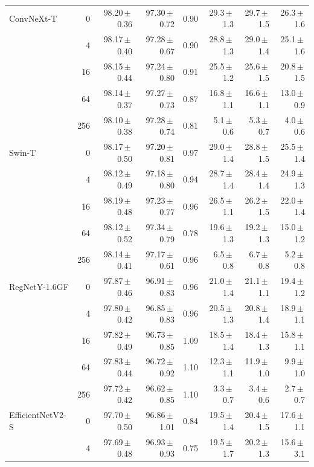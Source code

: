 {\begin{longtable}{lrrrrrrr}
ConvNeXt-T & 0 & 98.20\,$\pm$\,0.36 & 97.30\,$\pm$\,0.72 & 0.90 & 29.3\,$\pm$\,1.3 & 29.7\,$\pm$\,1.5 & 26.3\,$\pm$\,1.6 \\
 & 4 & 98.17\,$\pm$\,0.40 & 97.28\,$\pm$\,0.67 & 0.90 & 28.8\,$\pm$\,1.3 & 29.0\,$\pm$\,1.4 & 25.1\,$\pm$\,1.6 \\
 & 16 & 98.15\,$\pm$\,0.44 & 97.24\,$\pm$\,0.80 & 0.91 & 25.5\,$\pm$\,1.2 & 25.6\,$\pm$\,1.5 & 20.8\,$\pm$\,1.5 \\
 & 64 & 98.14\,$\pm$\,0.37 & 97.27\,$\pm$\,0.73 & 0.87 & 16.8\,$\pm$\,1.1 & 16.6\,$\pm$\,1.1 & 13.0\,$\pm$\,0.9 \\
 & 256 & 98.10\,$\pm$\,0.38 & 97.28\,$\pm$\,0.74 & 0.81 & 5.1\,$\pm$\,0.6 & 5.3\,$\pm$\,0.7 & 4.0\,$\pm$\,0.6 \\
Swin-T & 0 & 98.17\,$\pm$\,0.50 & 97.20\,$\pm$\,0.81 & 0.97 & 29.0\,$\pm$\,1.4 & 28.8\,$\pm$\,1.5 & 25.5\,$\pm$\,1.4 \\
 & 4 & 98.12\,$\pm$\,0.49 & 97.18\,$\pm$\,0.80 & 0.94 & 28.7\,$\pm$\,1.4 & 28.4\,$\pm$\,1.4 & 24.9\,$\pm$\,1.3 \\
 & 16 & 98.19\,$\pm$\,0.48 & 97.23\,$\pm$\,0.77 & 0.96 & 26.5\,$\pm$\,1.1 & 26.2\,$\pm$\,1.5 & 22.0\,$\pm$\,1.4 \\
 & 64 & 98.12\,$\pm$\,0.52 & 97.34\,$\pm$\,0.79 & 0.78 & 19.6\,$\pm$\,1.3 & 19.2\,$\pm$\,1.3 & 15.0\,$\pm$\,1.2 \\
 & 256 & 98.14\,$\pm$\,0.41 & 97.17\,$\pm$\,0.61 & 0.96 & 6.5\,$\pm$\,0.8 & 6.7\,$\pm$\,0.8 & 5.2\,$\pm$\,0.8 \\
RegNetY-1.6GF & 0 & 97.87\,$\pm$\,0.46 & 96.91\,$\pm$\,0.83 & 0.96 & 21.0\,$\pm$\,1.4 & 21.1\,$\pm$\,1.1 & 19.4\,$\pm$\,1.2 \\
 & 4 & 97.80\,$\pm$\,0.42 & 96.85\,$\pm$\,0.83 & 0.96 & 20.5\,$\pm$\,1.3 & 20.8\,$\pm$\,1.4 & 18.9\,$\pm$\,1.1 \\
 & 16 & 97.82\,$\pm$\,0.49 & 96.73\,$\pm$\,0.85 & 1.09 & 18.5\,$\pm$\,1.4 & 18.4\,$\pm$\,1.3 & 15.8\,$\pm$\,1.1 \\
 & 64 & 97.83\,$\pm$\,0.44 & 96.72\,$\pm$\,0.92 & 1.10 & 12.3\,$\pm$\,1.1 & 11.9\,$\pm$\,1.0 & 9.9\,$\pm$\,1.0 \\
 & 256 & 97.72\,$\pm$\,0.42 & 96.62\,$\pm$\,0.85 & 1.10 & 3.3\,$\pm$\,0.7 & 3.4\,$\pm$\,0.6 & 2.7\,$\pm$\,0.7 \\
EfficientNetV2-S & 0 & 97.70\,$\pm$\,0.50 & 96.86\,$\pm$\,1.01 & 0.84 & 19.5\,$\pm$\,1.4 & 20.4\,$\pm$\,1.5 & 17.6\,$\pm$\,1.1 \\
 & 4 & 97.69\,$\pm$\,0.48 & 96.93\,$\pm$\,0.93 & 0.75 & 19.5\,$\pm$\,1.7 & 20.2\,$\pm$\,1.3 & 15.6\,$\pm$\,3.1 \\

\end{longtable}}
